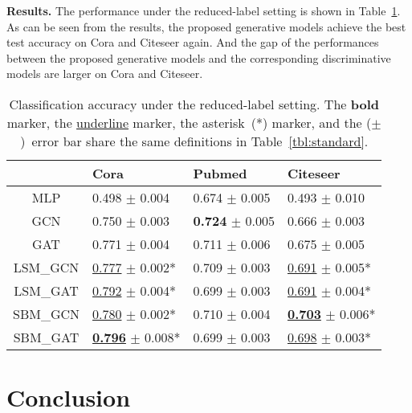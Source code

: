 \documentclass{article}
\newcommand{\vpara}[1]{\vspace{0.05in}\noindent\textbf{#1 }}
\begin{document}
\vpara{Results.}
The performance under the reduced-label setting is shown in Table~\ref{tbl:reduced}. As can be seen from the results, the proposed generative models achieve the best test accuracy on Cora and Citeseer again. And the gap of the performances between the proposed generative models and the corresponding discriminative models are larger on Cora and Citeseer. 

\begin{table}[tb]
\centering
\caption{Classification accuracy under the reduced-label setting. The \textbf{bold} marker, the \underline{underline} marker, the asterisk~(*) marker, and the ($\pm$)~error bar share the same definitions in Table~\ref{tbl:standard}.}
\label{tbl:reduced}
\begin{tabular}{clll}
\toprule
{} &                                            Cora &                              Pubmed &                                        Citeseer \\
\midrule
MLP     &                       0.498 $\pm$ \small{0.004} &           0.674 $\pm$ \small{0.005} &                       0.493 $\pm$ \small{0.010} \\
GCN     &                       0.750 $\pm$ \small{0.003} &  \textbf{0.724} $\pm$ \small{0.005} &                       0.666 $\pm$ \small{0.003} \\
GAT     &                       0.771 $\pm$ \small{0.004} &           0.711 $\pm$ \small{0.006} &                       0.675 $\pm$ \small{0.005} \\
\hline
LSM\_GCN &           \underline{0.777} $\pm$ \small{0.002}* &           0.709 $\pm$ \small{0.003} &           \underline{0.691} $\pm$ \small{0.005}* \\
LSM\_GAT &           \underline{0.792} $\pm$ \small{0.004}* &           0.699 $\pm$ \small{0.003} &           \underline{0.691} $\pm$ \small{0.004}* \\
SBM\_GCN &           \underline{0.780} $\pm$ \small{0.002}* &           0.710 $\pm$ \small{0.004} &  \underline{\textbf{0.703}} $\pm$ \small{0.006}* \\
SBM\_GAT &  \underline{\textbf{0.796}} $\pm$ \small{0.008}* &           0.699 $\pm$ \small{0.003} &           \underline{0.698} $\pm$ \small{0.003}* \\
\bottomrule
\end{tabular}
\end{table}

 \section{Conclusion}
\label{sec:conclusion}
\end{document}
